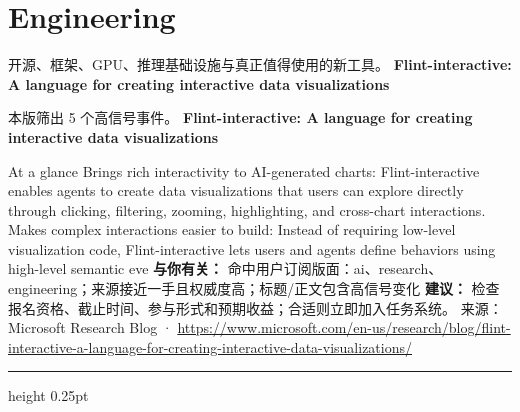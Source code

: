 \documentclass[10.5pt]{ctexart}
\begin{document}
\section*{Engineering}
{\color{ormuted} 开源、框架、GPU、推理基础设施与真正值得使用的新工具。}
\vspace{2mm}
{\LARGE\bfseries Flint-interactive: A language for creating interactive data visualizations}\par
\vspace{1mm}
{\color{ormuted} 本版筛出 5 个高信号事件。}
\vspace{3mm}
{\Large\bfseries Flint-interactive: A language for creating interactive data visualizations}\par
At a glance Brings rich interactivity to AI-generated charts: Flint-interactive enables agents to create data visualizations that users can explore directly through clicking, filtering, zooming, highlighting, and cross-chart interactions. Makes complex interactions easier to build: Instead of requiring low-level visualization code, Flint-interactive lets users and agents define behaviors using high-level semantic eve
\textbf{与你有关：} 命中用户订阅版面：ai、research、engineering；来源接近一手且权威度高；标题/正文包含高信号变化
\textbf{建议：} 检查报名资格、截止时间、参与形式和预期收益；合适则立即加入任务系统。
{\footnotesize\color{ormuted} 来源：Microsoft Research Blog · \url{https://www.microsoft.com/en-us/research/blog/flint-interactive-a-language-for-creating-interactive-data-visualizations/}}
\vspace{4mm}
\hrule height 0.25pt
\vspace{3mm}
\end{document}
